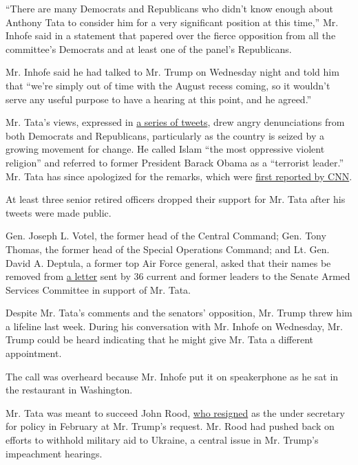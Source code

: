 ``There are many Democrats and Republicans who didn't know enough about
Anthony Tata to consider him for a very significant position at this
time,'' Mr. Inhofe said in a statement that papered over the fierce
opposition from all the committee's Democrats and at least one of the
panel's Republicans.

Mr. Inhofe said he had talked to Mr. Trump on Wednesday night and told
him that ``we're simply out of time with the August recess coming, so it
wouldn't serve any useful purpose to have a hearing at this point, and
he agreed.''

Mr. Tata's views, expressed in
\href{https://twitter.com/ajtata/status/1014278134185840640}{a series of
tweets}, drew angry denunciations from both Democrats and Republicans,
particularly as the country is seized by a growing movement for change.
He called Islam ``the most oppressive violent religion'' and referred to
former President Barack Obama as a ``terrorist leader.'' Mr. Tata has
since apologized for the remarks, which were
\href{https://edition.cnn.com/2020/06/12/politics/pentagon-nominee-tata-trump-kfile/index.html}{first
reported by CNN}.

At least three senior retired officers dropped their support for Mr.
Tata after his tweets were made public.

Gen. Joseph L. Votel, the former head of the Central Command; Gen. Tony
Thomas, the former head of the Special Operations Command; and Lt. Gen.
David A. Deptula, a former top Air Force general, asked that their names
be removed from
\href{https://s.wsj.net/public/resources/documents/Tata-Letter_06-18-2020.pdf}{a
letter} sent by 36 current and former leaders to the Senate Armed
Services Committee in support of Mr. Tata.

Despite Mr. Tata's comments and the senators' opposition, Mr. Trump
threw him a lifeline last week. During his conversation with Mr. Inhofe
on Wednesday, Mr. Trump could be heard indicating that he might give Mr.
Tata a different appointment.

The call was overheard because Mr. Inhofe put it on speakerphone as he
sat in the restaurant in Washington.

Mr. Tata was meant to succeed John Rood,
\href{https://www.nytimes.com/2020/02/19/us/politics/john-rood-trump.html}{who
resigned} as the under secretary for policy in February at Mr. Trump's
request. Mr. Rood had pushed back on efforts to withhold military aid to
Ukraine, a central issue in Mr. Trump's impeachment hearings.

